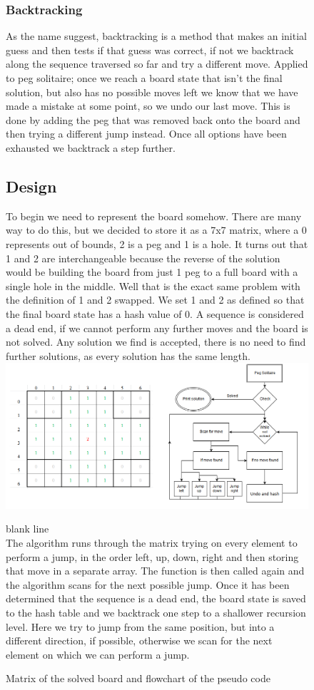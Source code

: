 \documentclass[11pt]{article}
\begin{document}
\begin{figure}

\subsubsection*{Backtracking}
As the name suggest, backtracking is a method that makes an initial guess and then tests if that guess was correct, if not we backtrack along the sequence traversed so far and try a different move. 
Applied to peg solitaire; once we reach a board state that isn't the final solution, but also has no possible moves left we know that we have made a mistake at some point, so we undo our last move. This is done by adding the peg that was removed back onto the board and then trying a different jump instead. Once all options have been exhausted we backtrack a step further.
\subsection{Design}
To begin we need to represent the board somehow. There are many way to do this, but we decided to store it as a 7x7 matrix, where a 0 represents out of bounds, 2 is a peg and 1 is a hole. It turns out that 1 and 2 are interchangeable because the reverse of the solution would be building the board from just 1 peg to a full board with a single hole in the middle. Well that is the exact same problem with the definition of 1 and 2 swapped. We set 1 and 2 as defined so that the final board state has a hash value of 0.
A sequence is considered a dead end, if we cannot perform any further moves and the board is not solved. Any solution we find is accepted, there is no need to find further solutions, as every solution has the same length.\\\newline
\includegraphics[width=15cm]{6}
\caption{Matrix of the solved board and flowchart of the pseudo code}
\label{fig:2}
\color{white} blank line\\
\color{black}
The algorithm runs through the matrix trying on every element to perform a jump, in the order left, up, down, right and then storing that move in a separate array. The function is then called again and the algorithm scans for the next possible jump. Once it has been determined that the sequence is a dead end, the board state is saved to the hash table and we backtrack one step to a shallower recursion level. Here we try to jump from the same position, but into a different direction, if possible, otherwise we scan for the next element on which we can perform a jump.
\end{figure}
\end{document}
